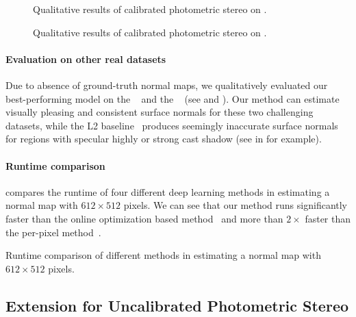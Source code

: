 \begin{figure}[htbp]\centering
    
    \caption[Qualitative results on \lightstage]{Qualitative results of calibrated photometric stereo on \lightstage.}
    \label{fig:qual_stage}
\end{figure}

\begin{figure}[htbp]\centering
    
    \caption[Qualitative results on \gourd]{Qualitative results of calibrated photometric stereo on \gourd.}
    \label{fig:qual_gourd}
\end{figure}

\paragraph{Evaluation on other real datasets}
Due to absence of ground-truth normal maps, we qualitatively evaluated our best-performing model \PSFCNplusN on the \gourd~\cite{alldrin2008p} and the \lightstage~\cite{einarsson2006relighting} (see  and ). 
Our method can estimate visually pleasing and consistent surface normals for these two challenging datasets, while the L2 baseline~\cite{woodham1980ps} produces seemingly inaccurate surface normals for regions with specular highly or strong cast shadow (see  in  for example).

\paragraph{Runtime comparison}
 compares the runtime of four different deep learning methods in estimating a normal map with $612\times 512$ pixels. We can see that our method runs significantly faster than the online optimization based method~\cite{Taniai18} and more than $2\times$ faster than the per-pixel method~\cite{santo2017deep,ikehata2018cnn}. 

\begin{table}[htbp]
    \caption[Runtime comparison of different methods]{Runtime comparison of different methods in estimating a normal map with $612\times 512$ pixels.} \label{tab:runtime}
    
\end{table}

\subsection{Extension for Uncalibrated Photometric Stereo}
\label{sub:upsfcn}

